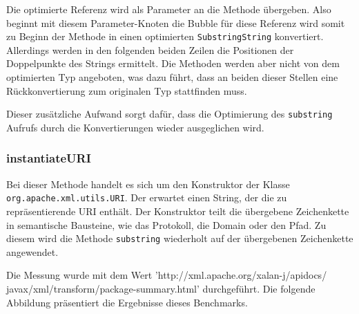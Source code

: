 Die optimierte Referenz wird als Parameter an die Methode übergeben. Also beginnt mit diesem 
Parameter-Knoten die Bubble für diese Referenz wird somit zu Beginn der Methode in einen
optimierten \texttt{SubstringString} konvertiert. Allerdings werden in den folgenden beiden 
Zeilen die Positionen der Doppelpunkte des Strings ermittelt. Die Methoden
werden aber nicht von dem optimierten Typ angeboten, was dazu führt, dass an beiden dieser 
Stellen eine Rückkonvertierung zum originalen Typ stattfinden muss. 

Dieser zusätzliche Aufwand sorgt dafür, dass die Optimierung des \texttt{substring} Aufrufs
durch die Konvertierungen wieder ausgeglichen wird. 

\subsubsection{instantiateURI}

Bei dieser Methode handelt es sich um den Konstruktor der Klasse\\ \texttt{org.apache.xml.utils.URI}.
Der erwartet einen String, der die zu repräsentierende URI enthält. Der Konstruktor teilt
die übergebene Zeichenkette in semantische Bausteine, wie das Protokoll, die Domain oder den Pfad.
Zu diesem wird die Methode \texttt{substring} wiederholt auf der übergebenen Zeichenkette angewendet. 

Die Messung wurde mit dem Wert 'http://xml.apache.org/xalan-j/apidocs/
javax/xml/transform/package-summary.html' durchgeführt. Die folgende Abbildung präsentiert 
die Ergebnisse dieses Benchmarks.

